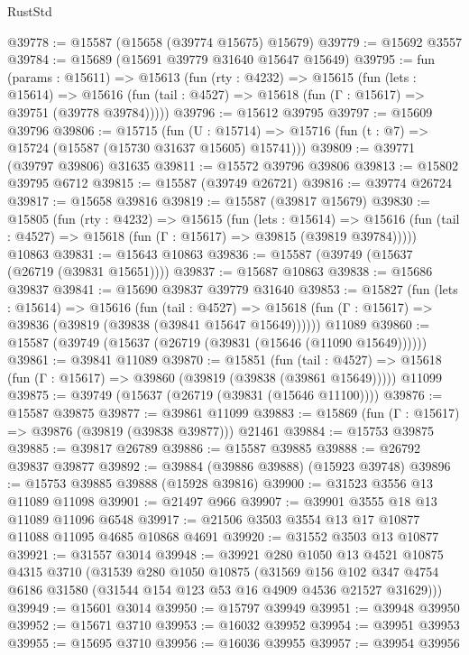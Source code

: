\begin{lexlean}{RustStd}
\begin{coremodule}
@39778 := @15587 (@15658 (@39774 @15675) @15679)
@39779 := @15692 @3557
@39784 := @15689 (@15691 @39779 @31640 @15647 @15649)
@39795 := fun (params : @15611) =>
  @15613
    (fun (rty : @4232) =>
    @15615
      (fun (lets : @15614) =>
      @15616 (fun (tail : @4527) => @15618 (fun (Γ : @15617) => @39751 (@39778 @39784)))))
@39796 := @15612 @39795
@39797 := @15609 @39796
@39806 := @15715
    (fun (U : @15714) => @15716 (fun (t : @7) => @15724 (@15587 (@15730 @31637 @15605) @15741)))
@39809 := @39771 (@39797 @39806) @31635
@39811 := @15572 @39796 @39806
@39813 := @15802 @39795 @6712
@39815 := @15587 (@39749 @26721)
@39816 := @39774 @26724
@39817 := @15658 @39816
@39819 := @15587 (@39817 @15679)
@39830 := @15805
    (fun (rty : @4232) =>
    @15615
      (fun (lets : @15614) =>
      @15616 (fun (tail : @4527) => @15618 (fun (Γ : @15617) => @39815 (@39819 @39784)))))
    @10863
@39831 := @15643 @10863
@39836 := @15587 (@39749 (@15637 (@26719 (@39831 @15651))))
@39837 := @15687 @10863
@39838 := @15686 @39837
@39841 := @15690 @39837 @39779 @31640
@39853 := @15827
    (fun (lets : @15614) =>
    @15616
      (fun (tail : @4527) =>
      @15618 (fun (Γ : @15617) => @39836 (@39819 (@39838 (@39841 @15647 @15649))))))
    @11089
@39860 := @15587 (@39749 (@15637 (@26719 (@39831 (@15646 (@11090 @15649))))))
@39861 := @39841 @11089
@39870 := @15851
    (fun (tail : @4527) => @15618 (fun (Γ : @15617) => @39860 (@39819 (@39838 (@39861 @15649)))))
    @11099
@39875 := @39749 (@15637 (@26719 (@39831 (@15646 @11100))))
@39876 := @15587 @39875
@39877 := @39861 @11099
@39883 := @15869 (fun (Γ : @15617) => @39876 (@39819 (@39838 @39877))) @21461
@39884 := @15753 @39875
@39885 := @39817 @26789
@39886 := @15587 @39885
@39888 := @26792 @39837 @39877
@39892 := @39884 (@39886 @39888) (@15923 @39748)
@39896 := @15753 @39885 @39888 (@15928 @39816)
@39900 := @31523 @3556 @13 @11089 @11098
@39901 := @21497 @966
@39907 := @39901 @3555 @18 @13 @11089 @11096 @6548
@39917 := @21506 @3503 @3554 @13 @17 @10877 @11088 @11095 @4685 @10868 @4691
@39920 := @31552 @3503 @13 @10877
@39921 := @31557 @3014
@39948 := @39921
    @280
    @1050
    @13
    @4521
    @10875
    @4315
    @3710
    (@31539
      @280
      @1050
      @10875
      (@31569
        @156
        @102
        @347
        @4754
        @6186
        @31580
        (@31544 @154 @123 @53 @16 @4909 @4536 @21527 @31629)))
@39949 := @15601 @3014
@39950 := @15797 @39949
@39951 := @39948 @39950
@39952 := @15671 @3710
@39953 := @16032 @39952
@39954 := @39951 @39953
@39955 := @15695 @3710
@39956 := @16036 @39955
@39957 := @39954 @39956

\end{coremodule}
\end{lexlean}
